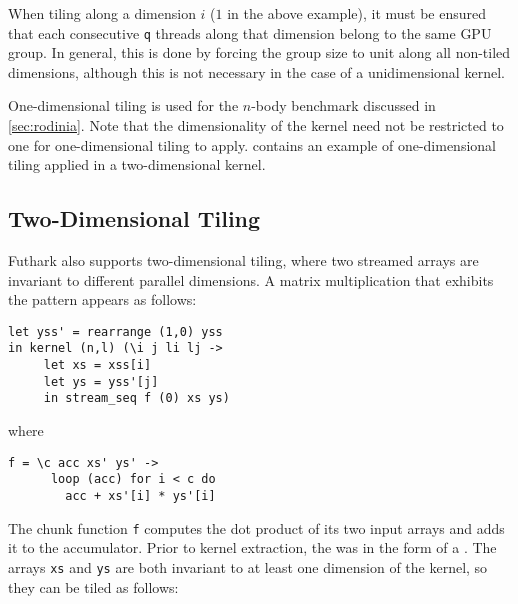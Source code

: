 When tiling along a dimension $i$ ($1$ in the above example), it must
be ensured that each consecutive \lstinline{q} threads along that
dimension belong to the same GPU group.  In general, this is done by
forcing the group size to unit along all non-tiled dimensions,
although this is not necessary in the case of a unidimensional kernel.

One-dimensional tiling is used for the $n$-body benchmark discussed in
\cref{sec:rodinia}.  Note that the dimensionality of the kernel need
not be restricted to one for one-dimensional tiling to apply.
 contains an example of one-dimensional tiling
applied in a two-dimensional kernel.

\subsection{Two-Dimensional Tiling}
\label{sec:two-dimensional-tiling}

Futhark also supports two-dimensional tiling, where two streamed
arrays are invariant to different parallel dimensions.  A matrix
multiplication that exhibits the pattern appears as follows:

\begin{lstlisting}
let yss' = rearrange (1,0) yss
in kernel (n,l) (\i j li lj ->
     let xs = xss[i]
     let ys = yss'[j]
     in stream_seq f (0) xs ys)
\end{lstlisting}
\begin{minipage}[t]{0.1\linewidth}
  \begin{flushright}
    where
  \end{flushright}
\end{minipage}
\begin{minipage}[t]{0.8\linewidth}
\lstinline{f = \c acc xs' ys' ->}\\
\lstinline{      loop (acc) for i < c do}\\
\lstinline{        acc + xs'[i] * ys'[i]}
\end{minipage}
\vspace{1em}

The chunk function \lstinline{f} computes the dot product of its two
input arrays and adds it to the accumulator.  Prior to kernel
extraction, the \StreamSeq{} was in the form of a .  The
arrays \lstinline{xs} and \lstinline{ys} are both invariant to at
least one dimension of the kernel, so they can be tiled as follows:

